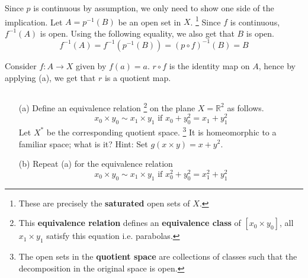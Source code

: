 \documentclass[../main.tex]{subfiles}
\begin{document}
Since $p$ is continuous by assumption, we only need to show one side of the implication.
Let $A = p^{-1}(B)$ be an open set in $X$.
\footnote{These are precisely the \textbf{saturated} open sets of $X$.}
Since $f$ is continuous, $f^{-1}(A)$ is open.
Using the following equality, we also get that $B$ is open.
\begin{equation*}
	f^{-1}(A) = f^{-1}(p^{-1}(B)) = (p \circ f)^{-1}(B) = B
\end{equation*}

Consider $f: A \to X$ given by $f(a) = a$.
$r \circ f$ is the identity map on $A$, hence by applying (a), we  get that $r$ is a quotient map.

\begin{problem}[\S 22 Ex. 4]
    $ $
    \begin{itemize}
        \item[(a)]
            Define an equivalence relation
            \footnote{This \textbf{equivalence relation} defines an \textbf{equivalence class} of $[x_0 \times y_0]$, all $x_1 \times y_1$ satisfy this equation i.e. parabolas.}
            on the plane $X = \mathbb{R}^2$ as follows.
            \begin{equation*}
                x_0 \times y_0 \sim x_1 \times y_1 \text{ if } x_0 + y_0^2 = x_1 + y_1^2
            \end{equation*}
            Let $X^*$ be the corresponding quotient space.
            \footnote{The open sets in the \textbf{quotient space} are collections of classes such that the decomposition in the original space is open.}
            It is homeomorphic to a familiar space; what is it?
            Hint: Set $g(x \times y) = x + y^2$.

        \item[(b)]
            Repeat (a) for the equivalence relation
            \begin{equation*}
                x_0 \times y_0 \sim x_1 \times y_1 \text{ if } x_0^2 + y_0^2 = x_1^2 + y_1^2
            \end{equation*}
    \end{itemize}
\end{problem}
\end{document}
